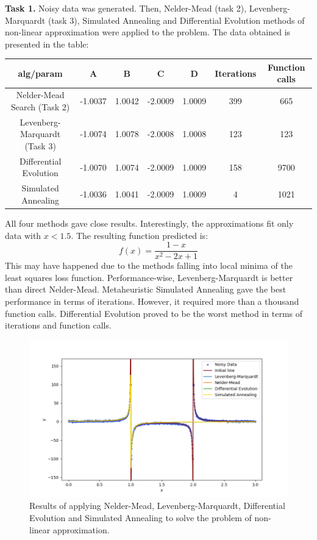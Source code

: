 \documentclass[12pt, a4paper]{article}
\begin{document}
\textbf{Task 1.} Noisy data was generated. Then, Nelder-Mead (task 2), Levenberg-Marquardt (task 3), Simulated Annealing and Differential Evolution methods of non-linear approximation were applied to the problem. The data obtained is presented in the table:
\begin{center}
\begin{tabular}{ccccccc}
\hline
alg/param                    & A & B & C & D & Iterations & Function calls \\ \hline
Nelder-Mead Search (Task 2)  & -1.0037 & 1.0042 & -2.0009 & 1.0009 & 399 & 665 \\
Levenberg-Marquardt (Task 3) & -1.0074 & 1.0078 & -2.0008 & 1.0008 & 123 & 123 \\
Differential Evolution       & -1.0070 & 1.0074 & -2.0009 & 1.0009 & 158 & 9700 \\
Simulated Annealing          & -1.0036 & 1.0041 & -2.0009 & 1.0009 & 4 & 1021 \\ \hline
\end{tabular}
\end{center}
All four methods gave close results. Interestingly, the approximations fit only data with $x < 1.5$. The resulting function predicted is:
\[ f(x) = \frac{1 - x}{x^2 - 2x + 1} \]
This may have happened due to the methods falling into local minima of the least squares loss function. Performance-wise, Levenberg-Marquardt is better than direct Nelder-Mead. Metaheuristic Simulated Annealing gave the best performance in terms of iterations. However, it required more than a thousand function calls. Differential Evolution proved to be the worst method in terms of iterations and function calls.

\begin{figure}[!h]
\centering
\includegraphics[width=\textwidth]{pic1.png}
\caption{Results of applying Nelder-Mead, Levenberg-Marquardt, Differential Evolution and Simulated Annealing to solve the problem of non-linear approximation.}
\end{figure}
\end{document}
